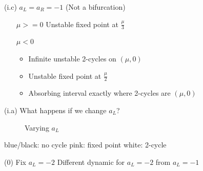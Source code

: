 \documentclass{beamer}
\newcounter{n}
\newcounter{f}
\begin{document}
\begin{frame}{(i.c) $a_L = a_R = -1$ (Not a bifurcation)}
    \begin{enumerate}
        \item[$\mu >= 0$] Unstable fixed point at $\frac{\mu}{3}$
        \item[$\mu < 0$] \begin{itemize}
            \item Infinite unstable 2-cycles on $(\mu, 0)$
            \item Unstable fixed point at $\frac{\mu}{2}$
            \item Absorbing interval exactly where 2-cycles are $(\mu, 0)$
        \end{itemize}
    \end{enumerate}
\end{frame}

\begin{frame}{(i.a) What happens if we change $a_L$?}
    \begin{figure}
        \centering
         \qquad
        \caption{Varying $a_L$}
    \end{figure}

    blue/black: no cycle
    \hspace*{\fill}
    pink: fixed point
    \hspace*{\fill}
    white: 2-cycle
\end{frame}

\begin{frame}{(0) Fix $a_L = -2$}
    Different dynamic for $a_L = -2$ from $a_L = -1$
\end{frame}
\end{document}
